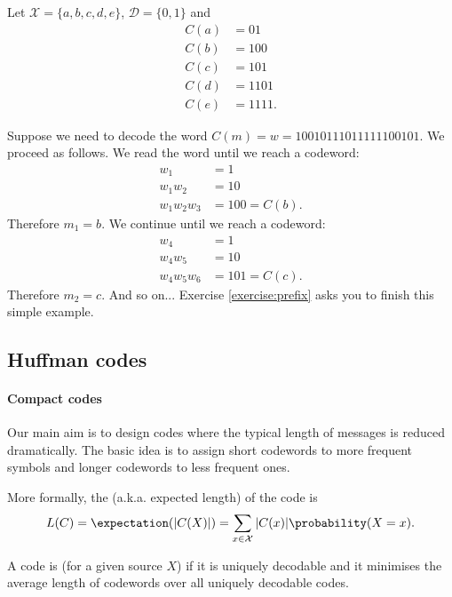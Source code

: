 \begin{example}
Let $\mathcal{X} = \{a, b, c, d, e\}$, $\mathcal{D} = \{0,1\}$ and 
\begin{align*}
    C(a) &= 01\\
    C(b) &= 100\\
    C(c) &= 101\\
    C(d) &= 1101\\
    C(e) &= 1111.
\end{align*}

Suppose we need to decode the word $C(m) = w = 10010111011111100101$. We proceed as follows. We read the word until we reach a codeword:
\begin{align*}
    w_1 &= 1\\
    w_1 w_2 &= 10\\
    w_1 w_2 w_3 &= 100 = C(b). 
\end{align*}
Therefore $m_1 = b$. We continue until we reach a codeword:
\begin{align*}
    w_4 &= 1\\
    w_4 w_5 &= 10\\
    w_4 w_5 w_6 &= 101 = C(c). 
\end{align*}
Therefore $m_2 = c$. And so on... Exercise \ref{exercise:prefix} asks you to finish this simple example.
\end{example}




\subsection{Huffman codes}


\paragraph{Compact codes}

Our main aim is to design codes where the typical length of messages is reduced dramatically. The basic idea is to assign short codewords to more frequent symbols and longer codewords to less frequent ones.


More formally, the  (a.k.a. expected length) of the code is 
\[
    L(C) = \expectation( |C(X)| ) = \sum_{x \in \mathcal{X}} |C(x)| \probability(X = x).
\]

A code is  (for a given source $X$) if it is uniquely decodable and it minimises the average length of codewords over all uniquely decodable codes.


